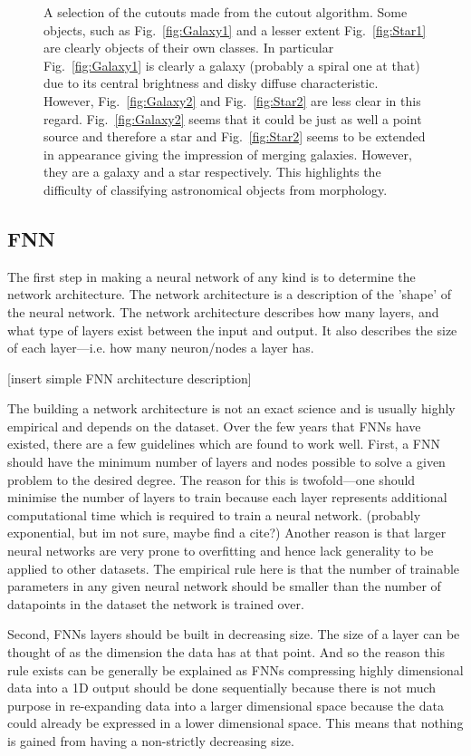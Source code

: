 \documentclass[a4paper,fleqn,usenatbib]{mnras}
\begin{document}
\begin{figure}
 \caption{A selection of the cutouts made from the cutout algorithm. Some objects, such as Fig.~\ref{fig:Galaxy1} and a lesser extent Fig.~\ref{fig:Star1} are clearly objects of their own classes. In particular Fig.~\ref{fig:Galaxy1} is clearly a galaxy (probably a spiral one at that) due to its central brightness and disky diffuse characteristic. However, Fig.~\ref{fig:Galaxy2} and Fig.~\ref{fig:Star2} are less clear in this regard. Fig.~\ref{fig:Galaxy2} seems that it could be just as well a point source and therefore a star and Fig.~\ref{fig:Star2} seems to be extended in appearance giving the impression of merging galaxies. However, they are a galaxy and a star respectively. This highlights the difficulty of classifying astronomical objects from morphology.}
 \label{fig:Examples}
 \end{figure}
 
\subsection{FNN}
The first step in making a neural network of any kind is to determine the network architecture. The network architecture is a description of the 'shape' of the neural network. The network architecture describes how many layers, and what type of layers exist between the input and output. It also describes the size of each layer---i.e. how many neuron/nodes a layer has. 

[insert simple FNN architecture description]

The building a network architecture is not an exact science and is usually highly empirical and depends on the dataset. Over the few years that FNNs have existed, there are a few guidelines which are found to work well. First, a FNN should have the minimum number of layers and nodes possible to solve a given problem to the desired degree. The reason for this is twofold---one should minimise the number of layers to train because each layer represents additional computational time which is required to train a neural network. (probably exponential, but im not sure, maybe find a cite?) Another reason is that larger neural networks are very prone to overfitting and hence lack generality to be applied to other datasets. The empirical rule here is that the number of trainable parameters in any given neural network should be smaller than the number of datapoints in the dataset the network is trained over. 

Second, FNNs layers should be built in decreasing size. The size of a layer can be thought of as the dimension the data has at that point. And so the reason this rule exists can be generally be explained as FNNs compressing highly dimensional data into a 1D output should be done sequentially because there is not much purpose in re-expanding data into a larger dimensional space because the data could already be expressed in a lower dimensional space. This means that nothing is gained from having a non-strictly decreasing size. 
\end{document}
